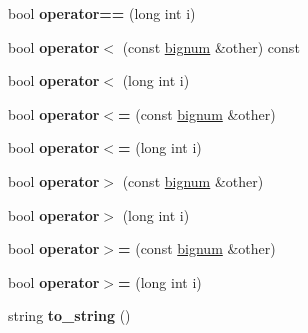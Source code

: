 \begin{DoxyCompactItemize}
\item 
\hypertarget{classbignum_ac2f7c60cf0aef476384f78542a142413}{bool {\bfseries operator==} (long int i)}\label{classbignum_ac2f7c60cf0aef476384f78542a142413}

\item 
\hypertarget{classbignum_ae4f4dbc03a7090cb369cdf7e8a8b76d8}{bool {\bfseries operator$<$} (const \hyperlink{classbignum}{bignum} \&other) const }\label{classbignum_ae4f4dbc03a7090cb369cdf7e8a8b76d8}

\item 
\hypertarget{classbignum_a5eece074b2f713de3907c97cf5b691c4}{bool {\bfseries operator$<$} (long int i)}\label{classbignum_a5eece074b2f713de3907c97cf5b691c4}

\item 
\hypertarget{classbignum_a02d2efb8a508afe1425cfb94185eb453}{bool {\bfseries operator$<$=} (const \hyperlink{classbignum}{bignum} \&other)}\label{classbignum_a02d2efb8a508afe1425cfb94185eb453}

\item 
\hypertarget{classbignum_af43aca79e2c9a32a68f63f6c5ecdf533}{bool {\bfseries operator$<$=} (long int i)}\label{classbignum_af43aca79e2c9a32a68f63f6c5ecdf533}

\item 
\hypertarget{classbignum_a246a1151b449433723c00ee0d2cbbe5f}{bool {\bfseries operator$>$} (const \hyperlink{classbignum}{bignum} \&other)}\label{classbignum_a246a1151b449433723c00ee0d2cbbe5f}

\item 
\hypertarget{classbignum_a13f091ae485bf085b9b09736b87fc0eb}{bool {\bfseries operator$>$} (long int i)}\label{classbignum_a13f091ae485bf085b9b09736b87fc0eb}

\item 
\hypertarget{classbignum_ace0e9a6071b11db6326f9736d7b59a5c}{bool {\bfseries operator$>$=} (const \hyperlink{classbignum}{bignum} \&other)}\label{classbignum_ace0e9a6071b11db6326f9736d7b59a5c}

\item 
\hypertarget{classbignum_a98cd05681f39cfa5e3848198ac110b7e}{bool {\bfseries operator$>$=} (long int i)}\label{classbignum_a98cd05681f39cfa5e3848198ac110b7e}

\item 
\hypertarget{classbignum_ab8a3fb4a4b1b9f8a606c3c69d5b0b82e}{string {\bfseries to\-\_\-string} ()}\label{classbignum_ab8a3fb4a4b1b9f8a606c3c69d5b0b82e}

\end{DoxyCompactItemize}
